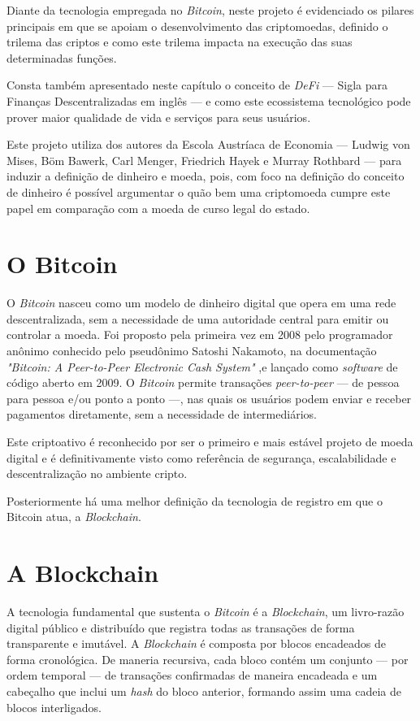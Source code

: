 Diante da tecnologia empregada no \textit{Bitcoin}, neste projeto é evidenciado os pilares principais em que se apoiam o desenvolvimento das criptomoedas, definido o trilema das criptos e como este trilema impacta na execução das suas determinadas funções.

Consta também apresentado neste capítulo o conceito de \textit{DeFi} — Sigla para Finanças Descentralizadas em inglês — e como este ecossistema tecnológico pode prover maior qualidade de vida e serviços para seus usuários.

Este projeto utiliza dos autores da Escola Austríaca de Economia — Ludwig von Mises, Böm Bawerk, Carl Menger, Friedrich Hayek e Murray Rothbard — para induzir a definição de dinheiro e moeda, pois, com foco na definição do conceito de dinheiro é possível argumentar o quão bem uma criptomoeda cumpre este papel em comparação com a moeda de curso legal do estado.

\section{O Bitcoin} \label{sec:bitcoin}
O \textit{Bitcoin} nasceu como um modelo de dinheiro digital que opera em uma rede descentralizada, sem a necessidade de uma autoridade central para emitir ou controlar a moeda. Foi proposto pela primeira vez em 2008 pelo programador anônimo conhecido pelo pseudônimo Satoshi Nakamoto, na documentação \textit{"Bitcoin: A Peer-to-Peer Electronic Cash System"} \cite{Nakamoto2009} ,e lançado como \textit{software} de código aberto em 2009. O \textit{Bitcoin} permite transações \textit{peer-to-peer} — de pessoa para pessoa e/ou ponto a ponto —, nas quais os usuários podem enviar e receber pagamentos diretamente, sem a necessidade de intermediários.

Este criptoativo é reconhecido por ser o primeiro e mais estável projeto de moeda digital e é definitivamente visto como referência de segurança, escalabilidade e descentralização no ambiente cripto.

Posteriormente há uma melhor definição da tecnologia de registro em que o Bitcoin atua, a \textit{Blockchain}.

\section*{A Blockchain} \label{subsec:blockchain}
A tecnologia fundamental que sustenta o \textit{Bitcoin} é a \textit{Blockchain}, um livro-razão digital público e distribuído que registra todas as transações de forma transparente e imutável. A \textit{Blockchain} é composta por blocos encadeados de forma cronológica. De maneria recursiva, cada bloco contém um conjunto — por ordem temporal — de transações confirmadas de maneira encadeada e um cabeçalho que inclui um \textit{hash} do bloco anterior, formando assim uma cadeia de blocos interligados.

